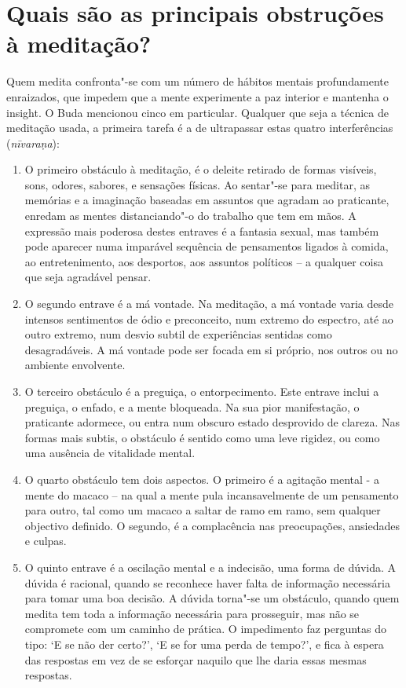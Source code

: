 \section{Quais são as principais obstruções à meditação?}

Quem medita confronta"-se com um número de hábitos mentais profundamente
enraizados, que impedem que a mente experimente a paz interior e
mantenha o insight. O Buda mencionou cinco em particular. Qualquer que
seja a técnica de meditação usada, a primeira tarefa é a de ultrapassar
estas quatro interferências (\emph{nīvaraṇa}):

\begin{enumerate}
\item
  O primeiro obstáculo à meditação, é o deleite retirado de formas
  visíveis, sons, odores, sabores, e sensações físicas. Ao sentar"-se
  para meditar, as memórias e a imaginação baseadas em assuntos que
  agradam ao praticante, enredam as mentes distanciando"-o do trabalho
  que tem em mãos. A expressão mais poderosa destes entraves é a
  fantasia sexual, mas também pode aparecer numa imparável sequência de
  pensamentos ligados à comida, ao entretenimento, aos desportos, aos
  assuntos políticos -- a qualquer coisa que seja agradável pensar.
\item
  O segundo entrave é a má vontade. Na meditação, a má vontade varia
  desde intensos sentimentos de ódio e preconceito, num extremo do
  espectro, até ao outro extremo, num desvio subtil de experiências
  sentidas como desagradáveis. A má vontade pode ser focada em si
  próprio, nos outros ou no ambiente envolvente.
\item
  O terceiro obstáculo é a preguiça, o entorpecimento. Este entrave
  inclui a preguiça, o enfado, e a mente bloqueada. Na sua pior
  manifestação, o praticante adormece, ou entra num obscuro estado
  desprovido de clareza. Nas formas mais subtis, o obstáculo é sentido
  como uma leve rigidez, ou como uma ausência de vitalidade mental.
\item
  O quarto obstáculo tem dois aspectos. O primeiro é a agitação mental -
  a mente do macaco -- na qual a mente pula incansavelmente de um
  pensamento para outro, tal como um macaco a saltar de ramo em ramo,
  sem qualquer objectivo definido. O segundo, é a complacência nas
  preocupações, ansiedades e culpas.
\item
  O quinto entrave é a oscilação mental e a indecisão, uma forma de
  dúvida. A dúvida é racional, quando se reconhece haver falta de
  informação necessária para tomar uma boa decisão. A dúvida torna"-se um
  obstáculo, quando quem medita tem toda a informação necessária para
  prosseguir, mas não se compromete com um caminho de prática. O
  impedimento faz perguntas do tipo: `E se não der certo?', `E se
  for uma perda de tempo?', e fica à espera das respostas em vez de se
  esforçar naquilo que lhe daria essas mesmas respostas.
\end{enumerate}

